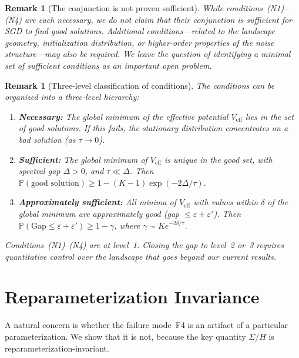 \documentclass[11pt,a4paper]{article}
\newtheorem{remark}[theorem]{Remark}
\newcommand{\Prob}{\mathbb{P}}
\newcommand{\Veff}{V_{\mathrm{eff}}}
\begin{document}
\begin{remark}[The conjunction is not proven sufficient]
\label{rem:not-sufficient}
While conditions~(N1)--(N4) are each necessary, we do not claim that their
conjunction is sufficient for SGD to find good solutions.  Additional
conditions---related to the landscape geometry, initialization distribution,
or higher-order properties of the noise structure---may also be required.
We leave the question of identifying a minimal set of sufficient conditions
as an important open problem.
\end{remark}

\begin{remark}[Three-level classification of conditions]
\label{rem:three-level}
The conditions can be organized into a three-level hierarchy:
\begin{enumerate}[nosep]
  \item \textbf{Necessary:} The global minimum of the effective potential
        $\Veff$ lies in the set of good solutions.  If this fails, the
        stationary distribution concentrates on a bad solution (as
        $\tau\to 0$).
  \item \textbf{Sufficient:} The global minimum of $\Veff$ is unique in the
        good set, with spectral gap $\Delta > 0$, and $\tau \ll \Delta$.
        Then $\Prob(\text{good solution}) \ge 1 - (K-1)\exp(-2\Delta/\tau)$.
  \item \textbf{Approximately sufficient:} All minima of $\Veff$ with values
        within $\delta$ of the global minimum are approximately good (gap
        $\le \varepsilon + \varepsilon'$).  Then
        $\Prob(\mathrm{Gap}\le\varepsilon+\varepsilon') \ge 1-\gamma$, where
        $\gamma \sim K e^{-2\delta/\tau}$.
\end{enumerate}
Conditions~(N1)--(N4) are at level~1.  Closing the gap to level~2 or~3
requires quantitative control over the landscape that goes beyond our
current results.
\end{remark}

\section{Reparameterization Invariance}
\label{sec:reparam}

A natural concern is whether the failure mode~F4 is an artifact of a
particular parameterization.  We show that it is not, because the key
quantity $\Sigma/H$ is reparameterization-invariant.
\end{document}
